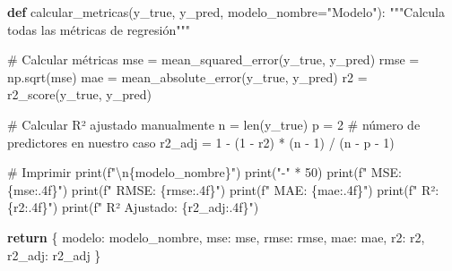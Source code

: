 \documentclass[
  doc,
  floatsintext,
  longtable,
  a4paper,
  nolmodern,
  notxfonts,
  notimes,
  12pt,
  colorlinks=true,linkcolor=blue,citecolor=blue,urlcolor=blue]{apa7}
\newenvironment{Shaded}{\begin{snugshade}}{\end{snugshade}}
\newcommand{\BuiltInTok}[1]{\textcolor[rgb]{0.00,0.23,0.31}{#1}}
\newcommand{\CharTok}[1]{\textcolor[rgb]{0.13,0.47,0.30}{#1}}
\newcommand{\CommentTok}[1]{\textcolor[rgb]{0.37,0.37,0.37}{#1}}
\newcommand{\ControlFlowTok}[1]{\textcolor[rgb]{0.00,0.23,0.31}{\textbf{#1}}}
\newcommand{\DecValTok}[1]{\textcolor[rgb]{0.68,0.00,0.00}{#1}}
\newcommand{\KeywordTok}[1]{\textcolor[rgb]{0.00,0.23,0.31}{\textbf{#1}}}
\newcommand{\NormalTok}[1]{\textcolor[rgb]{0.00,0.23,0.31}{#1}}
\newcommand{\OperatorTok}[1]{\textcolor[rgb]{0.37,0.37,0.37}{#1}}
\newcommand{\SpecialCharTok}[1]{\textcolor[rgb]{0.37,0.37,0.37}{#1}}
\newcommand{\SpecialStringTok}[1]{\textcolor[rgb]{0.13,0.47,0.30}{#1}}
\newcommand{\StringTok}[1]{\textcolor[rgb]{0.13,0.47,0.30}{#1}}
\begin{document}
\begin{Shaded}
\begin{Highlighting}[]
\KeywordTok{def}\NormalTok{ calcular\_metricas(y\_true, y\_pred, modelo\_nombre}\OperatorTok{=}\StringTok{"Modelo"}\NormalTok{):}
    \CommentTok{"""Calcula todas las métricas de regresión"""}
    
    \CommentTok{\# Calcular métricas}
\NormalTok{    mse }\OperatorTok{=}\NormalTok{ mean\_squared\_error(y\_true, y\_pred)}
\NormalTok{    rmse }\OperatorTok{=}\NormalTok{ np.sqrt(mse)}
\NormalTok{    mae }\OperatorTok{=}\NormalTok{ mean\_absolute\_error(y\_true, y\_pred)}
\NormalTok{    r2 }\OperatorTok{=}\NormalTok{ r2\_score(y\_true, y\_pred)}
    
    \CommentTok{\# Calcular R² ajustado manualmente}
\NormalTok{    n }\OperatorTok{=} \BuiltInTok{len}\NormalTok{(y\_true)}
\NormalTok{    p }\OperatorTok{=} \DecValTok{2}  \CommentTok{\# número de predictores en nuestro caso}
\NormalTok{    r2\_adj }\OperatorTok{=} \DecValTok{1} \OperatorTok{{-}}\NormalTok{ (}\DecValTok{1} \OperatorTok{{-}}\NormalTok{ r2) }\OperatorTok{*}\NormalTok{ (n }\OperatorTok{{-}} \DecValTok{1}\NormalTok{) }\OperatorTok{/}\NormalTok{ (n }\OperatorTok{{-}}\NormalTok{ p }\OperatorTok{{-}} \DecValTok{1}\NormalTok{)}
    
    \CommentTok{\# Imprimir}
    \BuiltInTok{print}\NormalTok{(}\SpecialStringTok{f"}\CharTok{\textbackslash{}n}\SpecialCharTok{\{}\NormalTok{modelo\_nombre}\SpecialCharTok{\}}\SpecialStringTok{"}\NormalTok{)}
    \BuiltInTok{print}\NormalTok{(}\StringTok{"{-}"} \OperatorTok{*} \DecValTok{50}\NormalTok{)}
    \BuiltInTok{print}\NormalTok{(}\SpecialStringTok{f"  MSE:          }\SpecialCharTok{\{}\NormalTok{mse}\SpecialCharTok{:.4f\}}\SpecialStringTok{"}\NormalTok{)}
    \BuiltInTok{print}\NormalTok{(}\SpecialStringTok{f"  RMSE:         }\SpecialCharTok{\{}\NormalTok{rmse}\SpecialCharTok{:.4f\}}\SpecialStringTok{"}\NormalTok{)}
    \BuiltInTok{print}\NormalTok{(}\SpecialStringTok{f"  MAE:          }\SpecialCharTok{\{}\NormalTok{mae}\SpecialCharTok{:.4f\}}\SpecialStringTok{"}\NormalTok{)}
    \BuiltInTok{print}\NormalTok{(}\SpecialStringTok{f"  R²:           }\SpecialCharTok{\{}\NormalTok{r2}\SpecialCharTok{:.4f\}}\SpecialStringTok{"}\NormalTok{)}
    \BuiltInTok{print}\NormalTok{(}\SpecialStringTok{f"  R² Ajustado:  }\SpecialCharTok{\{}\NormalTok{r2\_adj}\SpecialCharTok{:.4f\}}\SpecialStringTok{"}\NormalTok{)}
    
    \ControlFlowTok{return}\NormalTok{ \{}
        \StringTok{\textquotesingle{}modelo\textquotesingle{}}\NormalTok{: modelo\_nombre,}
        \StringTok{\textquotesingle{}mse\textquotesingle{}}\NormalTok{: mse,}
        \StringTok{\textquotesingle{}rmse\textquotesingle{}}\NormalTok{: rmse,}
        \StringTok{\textquotesingle{}mae\textquotesingle{}}\NormalTok{: mae,}
        \StringTok{\textquotesingle{}r2\textquotesingle{}}\NormalTok{: r2,}
        \StringTok{\textquotesingle{}r2\_adj\textquotesingle{}}\NormalTok{: r2\_adj}
\NormalTok{    \}}


\end{Highlighting}
\end{Shaded}
\end{document}
